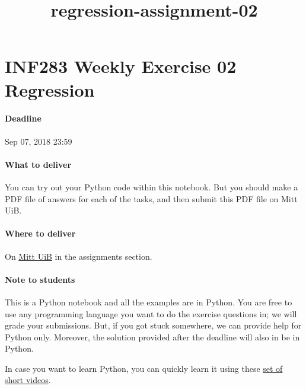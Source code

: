 \documentclass[11pt]{article}
\title{regression-assignment-02}
\begin{document}
    
    
    \maketitle
    
    

    
    \hypertarget{inf283-weekly-exercise-02-regression}{%
\section{INF283 \textbar{} Weekly Exercise 02 \textbar{}
Regression}\label{inf283-weekly-exercise-02-regression}}

\hypertarget{deadline}{%
\paragraph{Deadline}\label{deadline}}

Sep 07, 2018 \textbar{} 23:59

\hypertarget{what-to-deliver}{%
\paragraph{What to deliver}\label{what-to-deliver}}

You can try out your Python code within this notebook. But you should
make a PDF file of answers for each of the tasks, and then submit this
PDF file on Mitt UiB.

\hypertarget{where-to-deliver}{%
\paragraph{Where to deliver}\label{where-to-deliver}}

On \href{https://mitt.uib.no/courses/12791/assignments}{Mitt UiB} in the
assignments section.

\hypertarget{note-to-students}{%
\paragraph{Note to students}\label{note-to-students}}

This is a Python notebook and all the examples are in Python. You are
free to use any programming language you want to do the exercise
questions in; we will grade your submissions. But, if you got stuck
somewhere, we can provide help for Python only. Moreover, the solution
provided after the deadline will also in be in Python.

In case you want to learn Python, you can quickly learn it using these
\href{https://www.youtube.com/watch?v=oVp1vrfL_w4\&list=PLQVvvaa0QuDe8XSftW-RAxdo6OmaeL85M}{set
of short videos}.
\end{document}
